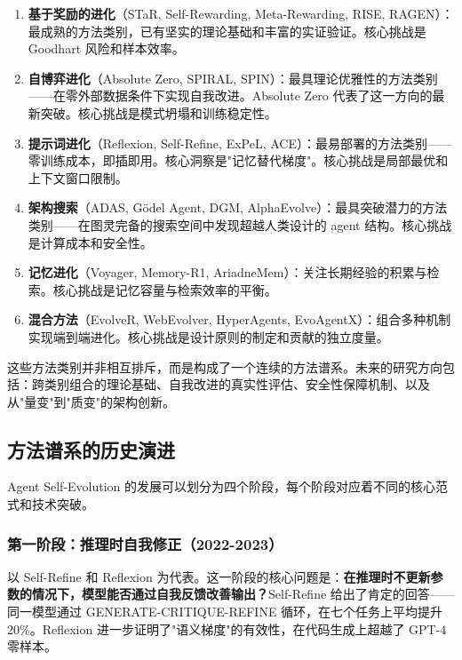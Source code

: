\begin{enumerate}
\item \textbf{基于奖励的进化}（STaR, Self-Rewarding, Meta-Rewarding, RISE, RAGEN）：最成熟的方法类别，已有坚实的理论基础和丰富的实证验证。核心挑战是 Goodhart 风险和样本效率。

\item \textbf{自博弈进化}（Absolute Zero, SPIRAL, SPIN）：最具理论优雅性的方法类别——在零外部数据条件下实现自我改进。Absolute Zero 代表了这一方向的最新突破。核心挑战是模式坍塌和训练稳定性。

\item \textbf{提示词进化}（Reflexion, Self-Refine, ExPeL, ACE）：最易部署的方法类别——零训练成本，即插即用。核心洞察是"记忆替代梯度"。核心挑战是局部最优和上下文窗口限制。

\item \textbf{架构搜索}（ADAS, Gödel Agent, DGM, AlphaEvolve）：最具突破潜力的方法类别——在图灵完备的搜索空间中发现超越人类设计的 agent 结构。核心挑战是计算成本和安全性。

\item \textbf{记忆进化}（Voyager, Memory-R1, AriadneMem）：关注长期经验的积累与检索。核心挑战是记忆容量与检索效率的平衡。

\item \textbf{混合方法}（EvolveR, WebEvolver, HyperAgents, EvoAgentX）：组合多种机制实现端到端进化。核心挑战是设计原则的制定和贡献的独立度量。
\end{enumerate}

这些方法类别并非相互排斥，而是构成了一个连续的方法谱系。未来的研究方向包括：跨类别组合的理论基础、自我改进的真实性评估、安全性保障机制、以及从"量变"到"质变"的架构创新。

\subsection{方法谱系的历史演进}\label{sec:ch3-history}

Agent Self-Evolution 的发展可以划分为四个阶段，每个阶段对应着不同的核心范式和技术突破。

\subsubsection{第一阶段：推理时自我修正（2022-2023）}

以 Self-Refine 和 Reflexion 为代表。这一阶段的核心问题是：\textbf{在推理时不更新参数的情况下，模型能否通过自我反馈改善输出？}Self-Refine 给出了肯定的回答——同一模型通过 GENERATE-CRITIQUE-REFINE 循环，在七个任务上平均提升 20\%。Reflexion 进一步证明了"语义梯度"的有效性，在代码生成上超越了 GPT-4 零样本。

